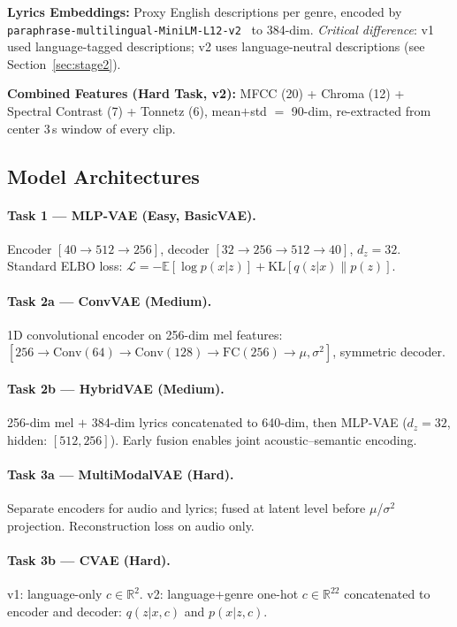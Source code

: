 \documentclass{article}
\begin{document}
\textbf{Lyrics Embeddings:} Proxy English descriptions per genre, encoded by
\texttt{paraphrase-multilingual-MiniLM-L12-v2}~\cite{reimers2019sentence} to 384-dim.
\emph{Critical difference}: v1 used language-tagged descriptions;
v2 uses language-neutral descriptions (see Section~\ref{sec:stage2}).

\textbf{Combined Features (Hard Task, v2):} MFCC (20) + Chroma (12) + Spectral Contrast (7) +
Tonnetz (6), mean$+$std $=$ 90-dim, re-extracted from center 3\,s window of every clip.

\subsection{Model Architectures}

\paragraph{Task 1 --- MLP-VAE (Easy, BasicVAE).}
Encoder $[40\!\to\!512\!\to\!256]$, decoder $[32\!\to\!256\!\to\!512\!\to\!40]$,
$d_z\!=\!32$. Standard ELBO loss:
$\mathcal{L} = -\mathbb{E}[\log p(x|z)] + \mathrm{KL}[q(z|x) \| p(z)]$.

\paragraph{Task 2a --- ConvVAE (Medium).}
1D convolutional encoder on 256-dim mel features:
$[256 \to \mathrm{Conv}(64) \to \mathrm{Conv}(128) \to \mathrm{FC}(256) \to \mu, \sigma^2]$,
symmetric decoder.

\paragraph{Task 2b --- HybridVAE (Medium).}
256-dim mel $+$ 384-dim lyrics concatenated to 640-dim, then MLP-VAE ($d_z\!=\!32$,
hidden: $[512, 256]$). Early fusion enables joint acoustic--semantic encoding.

\paragraph{Task 3a --- MultiModalVAE (Hard).}
Separate encoders for audio and lyrics; fused at latent level before $\mu$/$\sigma^2$
projection. Reconstruction loss on audio only.

\paragraph{Task 3b --- CVAE (Hard).}
v1: language-only $c \in \mathbb{R}^{2}$. v2: language+genre one-hot $c \in \mathbb{R}^{22}$
concatenated to encoder and decoder: $q(z|x,c)$ and $p(x|z,c)$.
\end{document}
